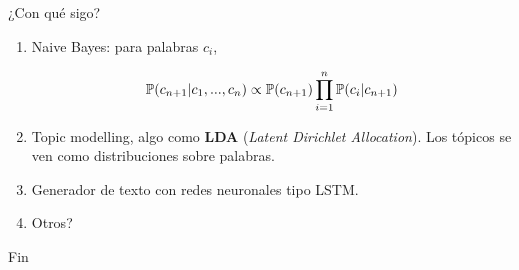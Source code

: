 \documentclass{beamer}
\begin{document}
	\begin{frame}{¿Con qué sigo?}
		\begin{enumerate}
			
			\item Naive Bayes: para palabras $c_i$,
			
				\begin{align*}
					\mathbb{P}(c_{n+1}|c_1,...,c_n) \propto \mathbb{P}(c_{n+1}) \prod_{i=1}^n  \mathbb{P}(c_i|c_{n+1}) 
				\end{align*}
			
			\item Topic modelling, algo como \textbf{LDA} (\textit{Latent Dirichlet Allocation}). Los tópicos se ven como distribuciones sobre palabras.
			
			\item Generador de texto con redes neuronales tipo LSTM.
			
			
			\item Otros?
		\end{enumerate}
	\end{frame}

	\begin{frame}{Fin}
		\centering
	\end{frame}

	
	
\end{document}
